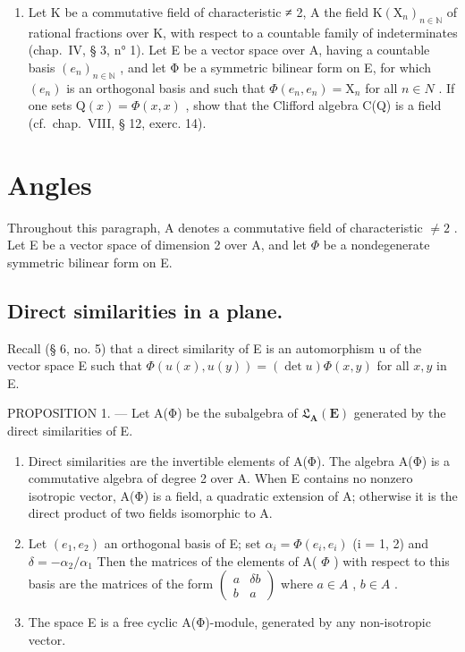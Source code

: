 \begin{enumerate}
\def\labelenumi{\arabic{enumi})}
\setcounter{enumi}{16}
\tightlist
\item
  Let K be a commutative field of characteristic ≠ 2, A the field \(\mathrm{K}(\mathrm{X}_{n})_{n\in\mathbb{N}}\) of rational fractions over K, with respect to a countable family of indeterminates (chap.~IV, § 3, n° 1). Let E be a vector space over A, having a countable basis \((e_{n})_{n\in\mathbb{N}}\) , and let Φ be a symmetric bilinear form on E, for which \((e_{n})\) is an orthogonal basis and such that \(\Phi(e_{n}, e_{n}) = \mathrm{X}_{n}\) for all \(n \in N\) . If one sets \(\mathrm{Q}(x) = \Phi(x, x)\) , show that the Clifford algebra C(Q) is a field (cf.~chap.~VIII, § 12, exerc. 14).
\end{enumerate}

\section{Angles}

Throughout this paragraph, A denotes a commutative field of characteristic \(\neq 2\) . Let E be a vector space of dimension 2 over A, and let \(\Phi\) be a nondegenerate symmetric bilinear form on E.

\subsection{Direct similarities in a plane.}

Recall (§ 6, no. 5) that a direct similarity of E is an automorphism u of the vector space E such that \(\Phi(u(x), u(y)) = (\det u)\Phi(x, y)\) for all \(x, y\) in E.

PROPOSITION 1. --- Let A(Φ) be the subalgebra of \(\mathfrak{L}_{\mathbf{A}}(\mathbf{E})\) generated by the direct similarities of E.

\begin{enumerate}
\def\labelenumi{\alph{enumi})}
\item
  Direct similarities are the invertible elements of A(Φ). The algebra A(Φ) is a commutative algebra of degree 2 over A. When E contains no nonzero isotropic vector, A(Φ) is a field, a quadratic extension of A; otherwise it is the direct product of two fields isomorphic to A.
\item
  Let \((e_{1}, e_{2})\) an orthogonal basis of E; set \(\alpha_{i} = \Phi(e_{i}, e_{i})\) (i = 1, 2) and \(\delta = -\alpha_{2}/\alpha_{1}\) Then the matrices of the elements of A( \(\Phi\) ) with respect to this basis are the matrices of the form \(\begin{pmatrix} a & \delta b \\ b & a \end{pmatrix}\) where \(a \in A\) , \(b \in A\) .
\item
  The space E is a free cyclic A(Φ)-module, generated by any non-isotropic vector.
\end{enumerate}

